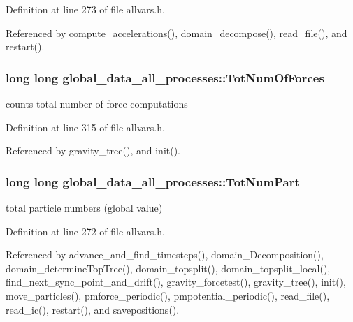 Definition at line 273 of file allvars.h.



Referenced by compute\_\-accelerations(), domain\_\-decompose(), read\_\-file(), and restart().

\hypertarget{structglobal__data__all__processes_a44181b6f6375de86c7dda1059d2fc3f4}{
\subsubsection[{TotNumOfForces}]{\setlength{\rightskip}{0pt plus 5cm}long long {\bf global\_\-data\_\-all\_\-processes::TotNumOfForces}}}
\label{structglobal__data__all__processes_a44181b6f6375de86c7dda1059d2fc3f4}
counts total number of force computations 

Definition at line 315 of file allvars.h.



Referenced by gravity\_\-tree(), and init().

\hypertarget{structglobal__data__all__processes_a853bbd3ea833c0a6a57af1434b611868}{
\subsubsection[{TotNumPart}]{\setlength{\rightskip}{0pt plus 5cm}long long {\bf global\_\-data\_\-all\_\-processes::TotNumPart}}}
\label{structglobal__data__all__processes_a853bbd3ea833c0a6a57af1434b611868}
total particle numbers (global value) 

Definition at line 272 of file allvars.h.



Referenced by advance\_\-and\_\-find\_\-timesteps(), domain\_\-Decomposition(), domain\_\-determineTopTree(), domain\_\-topsplit(), domain\_\-topsplit\_\-local(), find\_\-next\_\-sync\_\-point\_\-and\_\-drift(), gravity\_\-forcetest(), gravity\_\-tree(), init(), move\_\-particles(), pmforce\_\-periodic(), pmpotential\_\-periodic(), read\_\-file(), read\_\-ic(), restart(), and savepositions().

